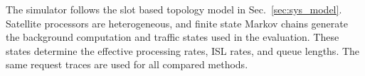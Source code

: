 \documentclass[10pt, conference, letterpaper]{IEEEtran}
\begin{document}

The simulator follows the slot based topology model in Sec.~\ref{sec:sys_model}. Satellite processors are heterogeneous, and finite state Markov chains generate the background computation and traffic states used in the evaluation. These states determine the effective processing rates, ISL rates, and queue lengths. The same request traces are used for all compared methods.
\end{document}
